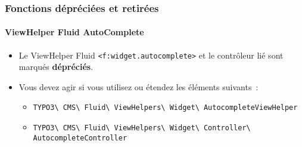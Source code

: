 \begin{frame}[fragile]
	\frametitle{Fonctions dépréciées et retirées}
	\framesubtitle{ViewHelper Fluid AutoComplete}

	\begin{itemize}
		\item Le ViewHelper Fluid \texttt{<f:widget.autocomplete>} et le contrôleur lié sont
			marqués \textbf{dépréciés}.
		\item Vous devez agir si vous utilisez ou étendez les éléments suivants~:

			\begin{itemize}\smaller
				\item \texttt{TYPO3\textbackslash
					CMS\textbackslash
					Fluid\textbackslash
					ViewHelpers\textbackslash
					Widget\textbackslash
					AutocompleteViewHelper}
				\item \texttt{TYPO3\textbackslash
					CMS\textbackslash
					Fluid\textbackslash
					ViewHelpers\textbackslash
					Widget\textbackslash
					Controller\textbackslash
					AutocompleteController}
			\end{itemize}

	\end{itemize}

\end{frame}


